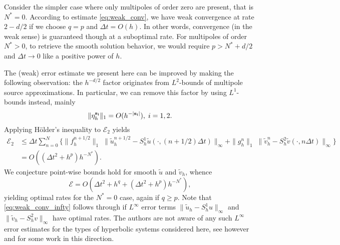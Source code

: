 Consider the simpler case where only multipoles of order zero are present, that is $N^*=0$.
According to estimate \ref{eq:weak_conv}, we have weak convergence at rate $2-d/2$ if we choose $q=p$ and $\Delta t = O(h)$.
In other words, convergence (in the weak sense) is guaranteed though at a suboptimal rate.
For multipoles of order $N^*>0$, to retrieve the smooth solution behavior, we would require $p > N^*+d/2$ and $\Delta t\to 0$ like a positive power of $h$.



The (weak) error estimate we present here can be improved by making the following observation: the $h^{-d/2}$ factor originates from $L^2$-bounds of multipole source approximations.
In particular, we can remove this factor by using $L^1$-bounds instead, mainly
\[
	\| \eta_h^{\mathbf s_{\bf i}}\|_1 = O(h^{-|\mathbf s_{\bf i}|}), \; i=1,2.
\] 
Applying H\"older's inequality to $\mathcal E_2$ yields
\begin{equation}
\label{eq:weak_conv_infty}
\begin{split}
	\mathcal E_2 &\le \Delta t \sum_{n=0}^N \Big\{ \|f_h^{n+1/2}\|_1 \; 
			\| \tilde u_h^{n+1/2} - S_h^1 \tilde u(\cdot,(n+1/2)\Delta t) \|_{\infty}
			+ \|g_h^{n}\|_1  \; \| \tilde v_h^n - S_h^2 \tilde v(\cdot,n\Delta t) \|_{\infty} \Big\}\\
					&= O((\Delta t^2+h^{p})h^{-N^*}).
\end{split}
\end{equation}
We conjecture point-wise bounds hold for smooth $\tilde u$ and $\tilde v_h$, whence
\begin{equation}\label{eq:conjecture}
	\mathcal E = O(\Delta t^2 +h^q + (\Delta t^2+h^{p})h^{-N^*}),
\end{equation}
yielding optimal rates for the $N^*=0$ case, again if $q\ge p$.
Note that \ref{eq:weak_conv_infty} follows through if $L^\infty$ error terms $\| \tilde u_h - S_h^1 u \|_\infty$ and $\| \tilde v_h - S_h^2 v \|_\infty$ have optimal rates.
The authors are not aware of any such $L^\infty$ error
estimates for the types of hyperbolic systems considered here, see
however \cite{Brenner:06} and \cite{Layton:82} for some work in this
direction.





